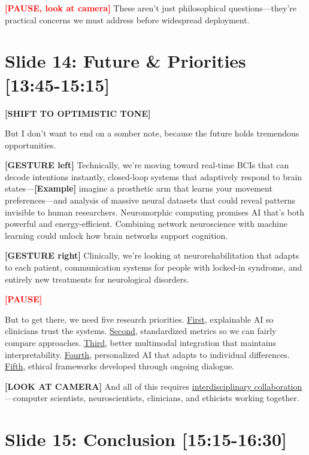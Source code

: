 \documentclass[12pt]{article}
\begin{document}
\textcolor{red}{\textbf{[PAUSE, look at camera]}} These aren't just philosophical questions—they're practical concerns we must address before widespread deployment.

\hrulefill

\section*{Slide 14: Future \& Priorities [13:45-15:15]}

\textcolor{DukeBlue}{\textbf{[SHIFT TO OPTIMISTIC TONE]}}

But I don't want to end on a somber note, because the future holds tremendous opportunities.

\textcolor{DukeBlue}{\textbf{[GESTURE left]}} Technically, we're moving toward real-time BCIs that can decode intentions instantly, closed-loop systems that adaptively respond to brain states—\textcolor{green!60!black}{\textbf{[Example]}} imagine a prosthetic arm that learns your movement preferences—and analysis of massive neural datasets that could reveal patterns invisible to human researchers. Neuromorphic computing promises AI that's both powerful and energy-efficient. Combining network neuroscience with machine learning could unlock how brain networks support cognition.

\textcolor{DukeBlue}{\textbf{[GESTURE right]}} Clinically, we're looking at neurorehabilitation that adapts to each patient, communication systems for people with locked-in syndrome, and entirely new treatments for neurological disorders.

\textcolor{red}{\textbf{[PAUSE]}}

But to get there, we need five research priorities. \ul{First}, explainable AI so clinicians trust the systems. \ul{Second}, standardized metrics so we can fairly compare approaches. \ul{Third}, better multimodal integration that maintains interpretability. \ul{Fourth}, personalized AI that adapts to individual differences. \ul{Fifth}, ethical frameworks developed through ongoing dialogue.

\textcolor{DukeBlue}{\textbf{[LOOK AT CAMERA]}} And all of this requires \ul{interdisciplinary collaboration}—computer scientists, neuroscientists, clinicians, and ethicists working together.

\hrulefill

\section*{Slide 15: Conclusion [15:15-16:30]}
\end{document}
